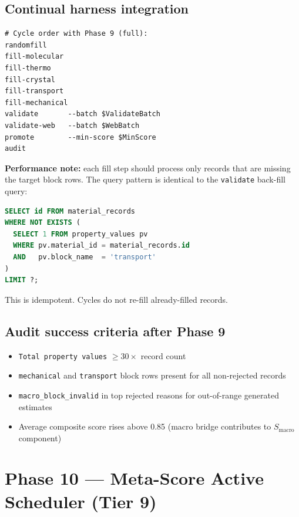 \documentclass[11pt, a4paper]{article}
\begin{document}
\subsection{Continual harness integration}

\begin{lstlisting}[language={}]
# Cycle order with Phase 9 (full):
randomfill
fill-molecular
fill-thermo
fill-crystal
fill-transport
fill-mechanical
validate       --batch $ValidateBatch
validate-web   --batch $WebBatch
promote        --min-score $MinScore
audit
\end{lstlisting}

\begin{phasebox}
\textbf{Performance note:} each fill step should process only records that are
missing the target block rows.  The query pattern is identical to the
\texttt{validate} back-fill query:
\begin{lstlisting}[language=SQL]
SELECT id FROM material_records
WHERE NOT EXISTS (
  SELECT 1 FROM property_values pv
  WHERE pv.material_id = material_records.id
  AND   pv.block_name  = 'transport'
)
LIMIT ?;
\end{lstlisting}
This is idempotent.  Cycles do not re-fill already-filled records.
\end{phasebox}

\subsection{Audit success criteria after Phase 9}

\begin{itemize}[leftmargin=*, itemsep=2pt]
  \item \texttt{Total property values} $\geq 30 \times$ record count
  \item \texttt{mechanical} and \texttt{transport} block rows present for all
		non-rejected records
  \item \texttt{macro\_block\_invalid} in top rejected reasons for out-of-range
		generated estimates
  \item Average composite score rises above 0.85 (macro bridge contributes
		to $S_\text{macro}$ component)
\end{itemize}

\section{Phase 10 --- Meta-Score Active Scheduler (Tier 9)}
\end{document}
